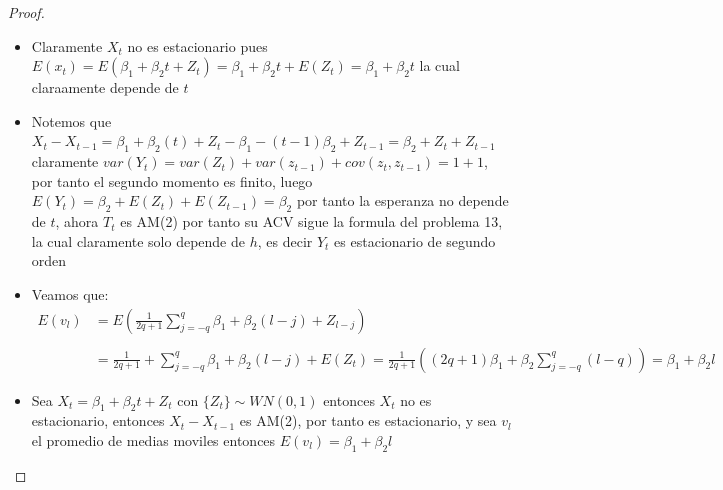 \documentclass[11pt,letterpaper]{article}
\begin{document}
\begin{proof}
    \begin{itemize}
        \item Claramente $X_t$ no es estacionario pues $E(x_t)=E(\beta_1+\beta_2t+Z_t)=\beta_1+\beta_2t+E(Z_t)=\beta_1+\beta_2t$ la cual claraamente depende de $t$
        \item Notemos que $X_{t}-X_{t-1}=\beta_1+\beta_2(t)+Z_{t}-\beta_1-(t-1)\beta_2+Z_{t-1}=\beta_2+Z_{t}+Z_{t-1}$ claramente $var(Y_t)=var(Z_{t})+var(z_{t-1})+cov(z_{t},z_{t-1})=1+1$, por tanto el segundo momento es finito,
        luego $E(Y_t)=\beta_2+E(Z_t)+E(Z_{t-1})=\beta_2$ por tanto la esperanza no depende de $t$, ahora $T_t$ es AM(2) por tanto su ACV sigue la formula del problema 13, la cual claramente solo depende de $h$, es decir $Y_t$ es estacionario de segundo orden
        \item Veamos que:\,\\
        \begin{align*}
            E(v_l)&=E\left(\frac{1}{2q+1}\sum_{j=-q}^q \beta_1+\beta_2(l-j)+Z_{l-j}\right)\,\\
            \,\\&=\frac{1}{2q+1}+\sum_{j=-q}^q \beta_1+\beta_2(l-j)+E(Z_t)=\frac{1}{2q+1}((2q+1)\beta_1+\beta_2\sum_{j=-q}^{q}(l-q))=\beta_1+\beta_2l
        \end{align*}
        \item Sea $ X_t=\beta_1+\beta_2t+Z_t$ con $\{Z_t\}\sim WN(0,1)$ entonces $X_t$ no es estacionario, entonces $X_{t}-X_{t-1}$ es AM(2), por tanto es estacionario, y sea $v_l$ el promedio de medias moviles entonces $E(v_l)=\beta_1+\beta_2l$
    \end{itemize}
\end{proof}
\end{document}
